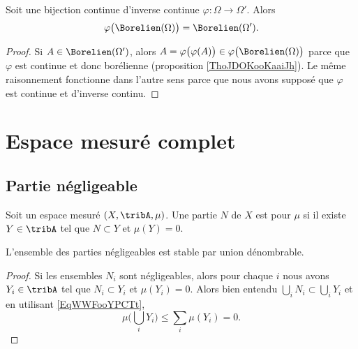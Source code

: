 \begin{proposition}
    Soit une bijection continue d'inverse continue \( \varphi\colon \Omega\to \Omega'\). Alors
    \begin{equation}
        \varphi\big( \Borelien(\Omega) \big)=\Borelien(\Omega').
    \end{equation}
\end{proposition}

\begin{proof}
    Si \( A\in \Borelien(\Omega')\), alors \( A=\varphi\big( \varphi(A) \big)\in\varphi\big( \Borelien(\Omega) \big)\) parce que \( \varphi\) est continue et donc borélienne (proposition \ref{ThoJDOKooKaaiJh}). Le même raisonnement fonctionne dans l'autre sens parce que nous avons supposé que \( \varphi\) est continue et d'inverse continu.
\end{proof}

\section{Espace mesuré complet}

\subsection{Partie négligeable}

\begin{definition}  \label{DefAVDoomkuXi}
    Soit un espace mesuré \( (X,\tribA,\mu)\). Une partie \( N\) de \( X\) est  pour \( \mu\) si il existe \( Y\in\tribA\) tel que \( N\subset Y\) et \( \mu(Y)=0\).
\end{definition}

\begin{lemma}   \label{LemVKNooOCOQw}
    L'ensemble des parties négligeables est stable par union dénombrable.
\end{lemma}

\begin{proof}
    Si les ensembles \( N_i\) sont négligeables, alors pour chaque \( i\) nous avons \( Y_i\in\tribA\) tel que \( N_i\subset Y_i\) et \( \mu(Y_i)=0\). Alors bien entendu \( \bigcup_iN_i\subset \bigcup_iY_i\) et en utilisant \eqref{EqWWFooYPCTt},
    \begin{equation}
        \mu\big( \bigcup_iY_i \big)\leq \sum_i\mu(Y_i)=0.
    \end{equation}
\end{proof}

